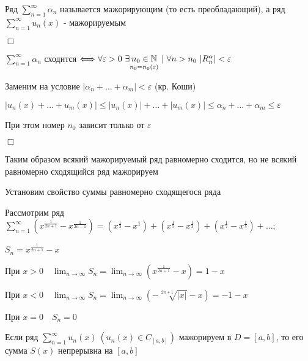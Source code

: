 \documentclass[12pt]{article}
\begin{document}
    \Nota Ряд $\sum_{n = 1}^\infty \alpha_n$ называется мажорирующим (то есть преобладающий), 
    а ряд $\sum_{n = 1}^\infty u_n(x)$ - мажорируемым

    \begin{MyProof}
        $\Box$

        $\sum_{n = 1}^\infty \alpha_n$ сходится $\Longleftrightarrow \forall \varepsilon > 0 \ \exists \underset{n_0 = n_0(\varepsilon)}{n_0 \in \mathbb{N}} \ | \
        \forall n > n_0 \ |R_n^\alpha| < \varepsilon$

        Заменим на условие $|\alpha_n + \dots + \alpha_m| < \varepsilon$ (кр. Коши)

        $|u_n(x) + \dots + u_m(x)| \leq |u_n(x)| + \dots + |u_m(x)| \leq \alpha_n + \dots + \alpha_m \leq \varepsilon$

        При этом номер $n_0$ зависит только от $\varepsilon$

        $\Box$
    \end{MyProof}

    \Nota Таким образом всякий мажорируемый ряд равномерно сходится, но не всякий равномерно сходящийся ряд мажорируем

    \Nota Установим свойство суммы равномерно сходящегося ряда

    \Exs Рассмотрим ряд $\sum_{n = 1}^\infty (x^{\frac{1}{2n + 1}} - x^{\frac{1}{2n - 1}}) = (x^\frac{1}{3} - x^1) + (x^\frac{1}{5} - x^\frac{1}{3}) + (x^\frac{1}{7} - x^\frac{1}{5}) + \dots;$

    $S_n = x^\frac{1}{2n + 1} - x$

    При $x > 0 \quad \lim_{n \to \infty} S_n = \lim_{n \to \infty} (x^\frac{1}{2n + 1} - x) = 1 - x$

    При $x < 0 \quad \lim_{n \to \infty} S_n = \lim_{n \to \infty} (-\sqrt[2n + 1]{|x|} - x) = -1 - x$

    При $x = 0 \quad S_n = 0$


    \hypertarget{functionalsumcontinuity}{}

    \begin{MyTheorem}
        \Ths Если ряд $\sum_{n = 1}^\infty u_n(x) \ (u_n(x) \in C_{[a, b]})$ мажорируем в $D = [a, b]$, то 
        его сумма $S(x)$ непрерывна на $[a, b]$
    \end{MyTheorem}
\end{document}
